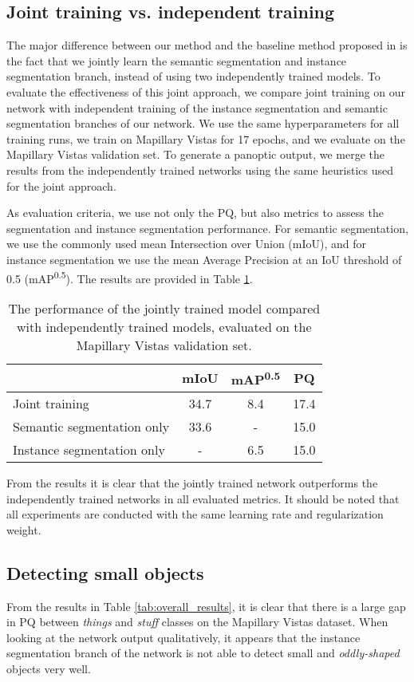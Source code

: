 \documentclass[10pt,twocolumn,letterpaper]{article}
\begin{document}
\subsection{Joint training vs. independent training}
\label{sec:joint_training}
The major difference between our method and the baseline method proposed in \cite{Kirillov2018} is the fact that we jointly learn the semantic segmentation and instance segmentation branch, instead of using two independently trained models. To evaluate the effectiveness of this joint approach, we compare joint training on our network with independent training of the instance segmentation and semantic segmentation branches of our network. We use the same hyperparameters for all training runs, we train on Mapillary Vistas for 17 epochs, and we evaluate on the Mapillary Vistas validation set. To generate a panoptic output, we merge the results from the independently trained networks using the same heuristics used for the joint approach.

As evaluation criteria, we use not only the PQ, but also metrics to assess the segmentation and instance segmentation performance. For semantic segmentation, we use the commonly used mean Intersection over Union (mIoU), and for instance segmentation we use the mean Average Precision at an IoU threshold of 0.5 (mAP\textsuperscript{0.5}). The results are provided in Table \ref{tab:joint_training}.


\begin{table}[ht]
\centering
\begin{tabular}{ l | c | c | c }
 & mIoU & mAP\textsuperscript{0.5} & PQ \\ \hline
Joint training & 34.7 & 8.4 & 17.4 \\
Semantic segmentation only & 33.6 & - & 15.0 \\
Instance segmentation only & - & 6.5 & 15.0 \\
\end{tabular}
\caption{The performance of the jointly trained model compared with independently trained models, evaluated on the Mapillary Vistas validation set.}
\label{tab:joint_training}
\end{table}

From the results it is clear that the jointly trained network outperforms the independently trained networks in all evaluated metrics. It should be noted that all experiments are conducted with the same learning rate and regularization weight. 

\subsection{Detecting small objects}
From the results in Table \ref{tab:overall_results}, it is clear that there is a large gap in PQ between \textit{things} and \textit{stuff} classes on the Mapillary Vistas dataset. When looking at the network output qualitatively, it appears that the instance segmentation branch of the network is not able to detect small and \textit{oddly-shaped} objects very well.
\end{document}
